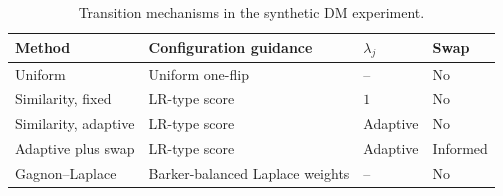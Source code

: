 \begin{table}[t]
\centering
\caption{Transition mechanisms in the synthetic DM experiment.}
\label{tab:DM_methods}
\fontsize{12}{9}\selectfont
\begin{tabular}{llll}
\toprule
Method & Configuration guidance & $\lambda_j$ & Swap \\
\midrule
Uniform & Uniform one-flip & -- & No \\
Similarity, fixed & LR-type score & $1$ & No \\
Similarity, adaptive & LR-type score & Adaptive & No \\
Adaptive plus swap & LR-type score & Adaptive & Informed \\
Gagnon--Laplace & Barker-balanced Laplace weights & -- & No \\
\bottomrule
\end{tabular}
\end{table}
